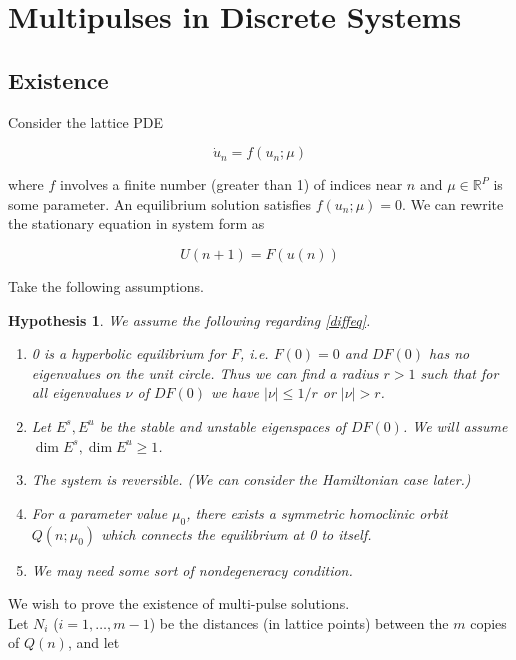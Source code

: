\documentclass[12pt]{article}
\def\R{{\mathbb R}}
\newtheorem{hypothesis}{Hypothesis}
\begin{document}
\section{Multipulses in Discrete Systems}

\subsection{Existence}

Consider the lattice PDE

\begin{equation}\label{latticePDE}
\dot{u}_n = f(u_n; \mu)
\end{equation}

where $f$ involves a finite number (greater than 1) of indices near $n$ and $\mu \in \R^P$ is some parameter. An equilibrium solution satisfies $f(u_n; \mu) = 0$. We can rewrite the stationary equation in system form as

\begin{equation}\label{diffeq}
U(n+1) = F(u(n))
\end{equation}

Take the following assumptions.

\begin{hypothesis}\label{initialhyp}
We assume the following regarding \eqref{diffeq}.
\begin{enumerate}[(0)]
\item 0 is a hyperbolic equilibrium for $F$, i.e. $F(0) = 0$ and $DF(0)$ has no eigenvalues on the unit circle. Thus we can find a radius $r > 1$ such that for all eigenvalues $\nu$ of $DF(0)$ we have $|\nu| \leq 1/r$ or $|\nu| > r$.
\item Let $E^s, E^u$ be the stable and unstable eigenspaces of $DF(0)$. We will assume $\dim E^s, \dim E^u \geq 1$.
\item The system is reversible. (We can consider the Hamiltonian case later.)
\item For a parameter value $\mu_0$, there exists a symmetric homoclinic orbit $Q(n; \mu_0)$ which connects the equilibrium at 0 to itself.
\item We may need some sort of nondegeneracy condition.
\end{enumerate}
\end{hypothesis}

We wish to prove the existence of multi-pulse solutions.\\

Let $N_i$ ($i = 1, \dots, m-1$) be the distances (in lattice points) between the $m$ copies of $Q(n)$, and let
\end{document}
